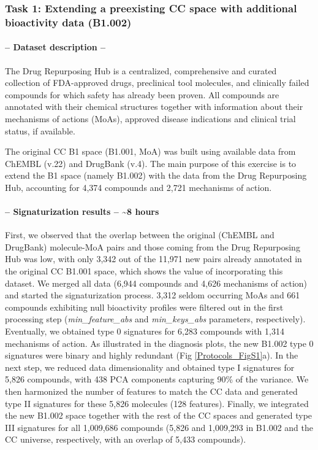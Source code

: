 

\subsubsection{Task 1: Extending a preexisting CC space with additional bioactivity data (B1.002)}

\paragraph{-- Dataset description --} \leavevmode

The Drug Repurposing Hub\cite{corsello_drug_2017} is a centralized, comprehensive and curated collection of FDA-approved drugs, preclinical tool molecules, and clinically failed compounds for which safety has already been proven. All compounds are annotated with their chemical structures together with information about their mechanisms of actions (MoAs), approved disease indications and clinical trial status, if available.

The original CC B1 space (B1.001, MoA) was built using available data from ChEMBL (v.22) and DrugBank (v.4). The main purpose of this exercise is to extend the B1 space (namely B1.002) with the data from the Drug Repurposing Hub, accounting for 4,374 compounds and 2,721 mechanisms of action. 

\paragraph{-- Signaturization results -- \textasciitilde8 hours}  \leavevmode

First, we observed that the overlap between the original (ChEMBL and DrugBank) molecule-MoA pairs and those coming from the Drug Repurposing Hub was low, with only 3,342 out of the 11,971 new pairs already annotated in the original CC B1.001 space, which shows the value of incorporating this dataset. We merged all data (6,944 compounds and 4,626 mechanisms of action) and started the signaturization process. 3,312 seldom occurring MoAs and 661 compounds exhibiting null bioactivity profiles were filtered out in the first processing step (\textit{min\_feature\_abs} and \textit{min\_keys\_abs} parameters, respectively). Eventually, we obtained type 0 signatures for 6,283 compounds with 1,314 mechanisms of action. As illustrated in the diagnosis plots, the new B1.002 type 0 signatures were binary and highly redundant (Fig \ref{Protocols_FigS1}a). In the next step, we reduced data dimensionality and obtained type I signatures for 5,826 compounds, with 438 PCA components capturing 90\% of the variance. We then harmonized the number of features to match the CC data and generated type II signatures for these 5,826 molecules (128 features). Finally, we integrated the new B1.002 space together with the rest of the CC spaces and generated type III signatures for all 1,009,686 compounds (5,826 and 1,009,293 in B1.002 and the CC universe, respectively, with an overlap of 5,433 compounds). 

